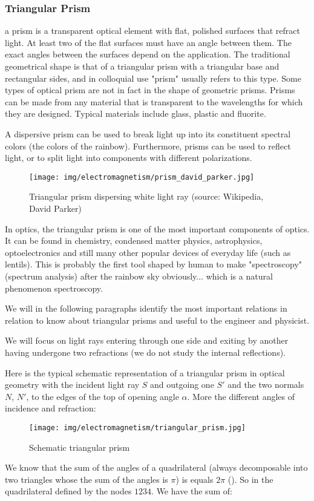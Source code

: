	\subsubsection{Triangular Prism}
	 a prism is a transparent optical element with flat, polished surfaces that refract light. At least two of the flat surfaces must have an angle between them. The exact angles between the surfaces depend on the application. The traditional geometrical shape is that of a triangular prism with a triangular base and rectangular sides, and in colloquial use "prism" usually refers to this type. Some types of optical prism are not in fact in the shape of geometric prisms. Prisms can be made from any material that is transparent to the wavelengths for which they are designed. Typical materials include glass, plastic and fluorite.

	A dispersive prism can be used to break light up into its constituent spectral colors (the colors of the rainbow). Furthermore, prisms can be used to reflect light, or to split light into components with different polarizations.
	\begin{figure}[H]
		\centering
		\texttt{[image: img/electromagnetism/prism\_david\_parker.jpg]}
		\caption{Triangular prism dispersing white light ray (source: Wikipedia, David Parker)}
	\end{figure}
	In optics, the triangular prism is one of the most important components of optics. It can be found in chemistry, condensed matter physics, astrophysics, optoelectronics and still many other popular devices of everyday life (such as lentils). This is probably the first tool shaped by human to make "spectroscopy" (spectrum analysis) after the rainbow sky obviously... which is a natural phenomenon spectroscopy.
	
	We will in the following paragraphs identify the most important relations in relation to know about triangular prisms and useful to the engineer and physicist.

	We will focus on light rays entering through one side and exiting by another having undergone two refractions (we do not study the internal reflections).

	Here is the typical schematic representation of a triangular prism in optical geometry with the incident light ray $S$ and outgoing one $S'$ and the two normals $N$, $N'$, to the edges of the top of opening angle $\alpha$. More the different angles of incidence and refraction:
	\begin{figure}[H]
		\centering
		\texttt{[image: img/electromagnetism/triangular\_prism.jpg]}
		\caption[]{Schematic triangular prism}
	\end{figure}
	We know that the sum of the angles of a quadrilateral (always decomposable into two triangles whose the sum of the angles is $\pi$) is equals $2\pi$ (). So in the quadrilateral defined by the nodes $1234$. We have the sum of:
	
